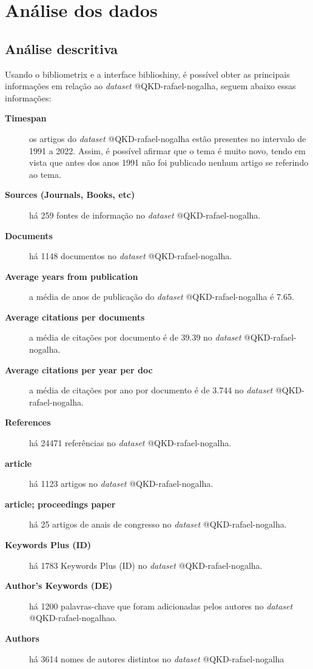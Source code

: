 \section{Análise dos dados}

\subsection{Análise descritiva}

Usando o bibliometrix e a interface biblioshiny, é possível obter as principais informações em relação ao \textit{dataset} @QKD-rafael-nogalha, seguem abaixo essas informações:
\begin{description}
    \item[\textbf{Timespan}] os artigos do \textit{dataset} @QKD-rafael-nogalha estão presentes no intervalo de 1991 a 2022.
    Assim, é possível afirmar que o tema é muito novo, tendo em vista que antes dos anos 1991 não foi publicado nenhum artigo se referindo ao tema.
    \item[\textbf{Sources (Journals, Books, etc)}] há 259 fontes de informação no \textit{dataset} @QKD-rafael-nogalha.
    \item[\textbf{Documents}] há 1148 documentos no \textit{dataset} @QKD-rafael-nogalha.
    \item[\textbf{Average years from publication}] a média de anos de publicação do \textit{dataset} @QKD-rafael-nogalha é 7.65.
    \item[\textbf{Average citations per documents}] a média de citações por documento é de 39.39 no \textit{dataset} @QKD-rafael-nogalha.
    \item[\textbf{Average citations per year per doc}] a média de citações por ano por documento é de 3.744 no \textit{dataset} @QKD-rafael-nogalha.
    \item[\textbf{References}] há 24471 referências no \textit{dataset} @QKD-rafael-nogalha.
    \item[\textbf{article}] há 1123 artigos no \textit{dataset} @QKD-rafael-nogalha.
    \item[\textbf{article; proceedings paper}] há 25 artigos de anais de congresso no \textit{dataset} @QKD-rafael-nogalha.
    \item[\textbf{Keywords Plus (ID)}] há 1783 Keywords Plus (ID) no \textit{dataset} @QKD-rafael-nogalha.
    \item[\textbf{Author's Keywords (DE)}] há 1200 palavras-chave que foram adicionadas pelos autores no \textit{dataset} @QKD-rafael-nogalhao.
    \item[\textbf{Authors}] há 3614 nomes de autores distintos no \textit{dataset} @QKD-rafael-nogalha

\end{description}
